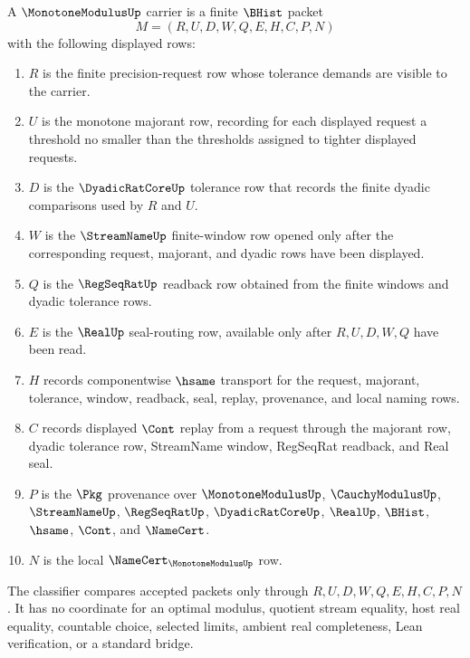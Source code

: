 \begin{definition}
\label{def:monotone-modulus-carrier}
A $\MonotoneModulusUp$ carrier is a finite $\BHist$ packet
$$
M=(R,U,D,W,Q,E,H,C,P,N)
$$
with the following displayed rows:
\begin{enumerate}
\item $R$ is the finite precision-request row whose tolerance demands are visible to the carrier.
\item $U$ is the monotone majorant row, recording for each displayed request a threshold no smaller than the thresholds assigned to tighter displayed requests.
\item $D$ is the $\DyadicRatCoreUp$ tolerance row that records the finite dyadic comparisons used by $R$ and $U$.
\item $W$ is the $\StreamNameUp$ finite-window row opened only after the corresponding request, majorant, and dyadic rows have been displayed.
\item $Q$ is the $\RegSeqRatUp$ readback row obtained from the finite windows and dyadic tolerance rows.
\item $E$ is the $\RealUp$ seal-routing row, available only after $R,U,D,W,Q$ have been read.
\item $H$ records componentwise $\hsame$ transport for the request, majorant, tolerance, window, readback, seal, replay, provenance, and local naming rows.
\item $C$ records displayed $\Cont$ replay from a request through the majorant row, dyadic tolerance row, StreamName window, RegSeqRat readback, and Real seal.
\item $P$ is the $\Pkg$ provenance over $\MonotoneModulusUp$, $\CauchyModulusUp$, $\StreamNameUp$, $\RegSeqRatUp$, $\DyadicRatCoreUp$, $\RealUp$, $\BHist$, $\hsame$, $\Cont$, and $\NameCert$.
\item $N$ is the local $\NameCert_{\MonotoneModulusUp}$ row.
\end{enumerate}
The classifier compares accepted packets only through $R,U,D,W,Q,E,H,C,P,N$. It has no coordinate for an optimal modulus, quotient stream equality, host real equality, countable choice, selected limits, ambient real completeness, Lean verification, or a standard bridge.
\end{definition}


